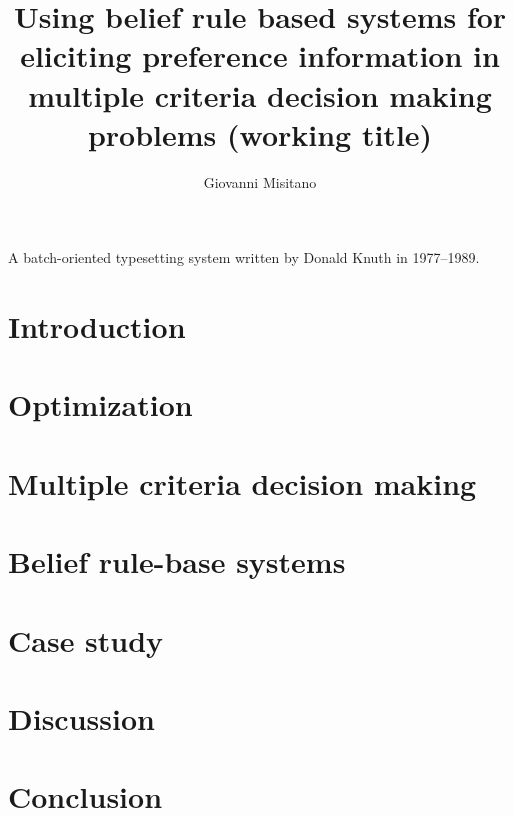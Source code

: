 \documentclass[utf8,english]{gradu3}
\begin{document}
\title{Using belief rule based systems for eliciting preference information in multiple criteria decision making problems (working title)}

\author{Giovanni Misitano}


\maketitle

\begin{thetermlist}
\item[\TeX] A batch-oriented typesetting system written by 
Donald Knuth in 1977--1989.
\end{thetermlist}

\mainmatter

\chapter{Introduction}


\chapter{Optimization}


\chapter{Multiple criteria decision making}


\chapter{Belief rule-base systems}


\chapter{Case study}


\chapter{Discussion}


\chapter{Conclusion}


\printbibliography

\appendix

\end{document}
